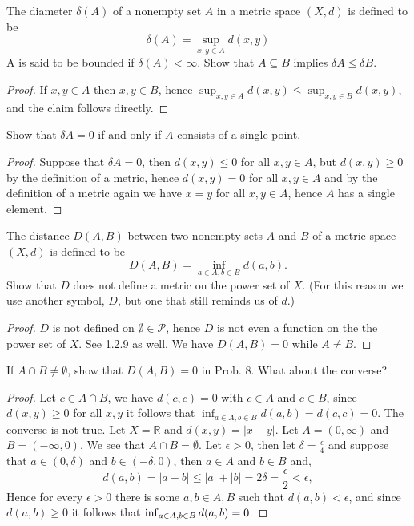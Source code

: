 \documentclass[12pt]{article}
\newcommand{\R}{\mathbb{R}}
\newcommand{\seq}{\subseteq}
\newcommand{\e}{\epsilon}
\newcommand{\de}{\delta}
\newcommand{\es}{\emptyset}
\newcommand{\mc}{\mathcal}
\newcommand{\ic}{\cap}
\newenvironment{exercise}[2][Exercise]{\begin{trivlist}
\item[\hskip \labelsep {\bfseries #1}\hskip \labelsep {\bfseries #2.}]}{\end{trivlist}}
\begin{document}
\begin{exercise}{1.2.6}
    The diameter $\de(A)$ of a nonempty set $A$ in a metric space $(X, d)$ is defined to be
    \[ \de (A) = \sup_{x, y \in A} d(x, y) \]
    A is said to be bounded if $\de(A) < \infty$. Show that $A \seq B$ implies $\de A \leq \de B$.
\end{exercise}
\begin{proof}
    If $x, y \in A$ then $x, y \in B$, hence $\sup_{x, y \in A} d(x, y) \leq \sup_{x, y \in B} d(x, y)$, and the claim follows directly.
\end{proof}

\begin{exercise}{1.2.7}
    Show that $\de A = 0$ if and only if $A$ consists of a single point.
\end{exercise}
\begin{proof}
    Suppose that $\de A = 0$, then $d(x, y) \leq 0$ for all $x, y \in A$, but $d(x, y) \geq 0$ by the definition of a metric, hence $d(x, y) = 0$ for all $x, y \in A$ and by the definition of a metric again we have $x = y$ for all $x, y \in A$, hence $A$ has a single element.
\end{proof}

\begin{exercise}{1.2.8}
    The distance $D(A, B)$ between two nonempty sets $A$ and $B$ of a metric space $(X, d)$ is defined to be
    \[ D(A, B) = \inf_{a \in A, b \in B} d(a, b). \]
    Show that $D$ does not define a metric on the power set of $X$. (For this reason we use another symbol, $D$, but one that still reminds us of $d$.)
\end{exercise}
\begin{proof}
    $D$ is not defined on $\es \in \mc P$, hence $D$ is not even a function on the the power set of $X$. See 1.2.9 as well. We have $D(A, B) = 0$ while $A \neq B$.
\end{proof}


\begin{exercise}{1.2.9}
    If $A \ic B \neq \es$, show that $D(A, B) = 0$ in Prob. 8. What about the converse?
\end{exercise}
\begin{proof}
    Let $c \in A \ic B$, we have $d(c, c) = 0$ with $c \in A$ and $c \in B$, since $d(x, y) \geq 0$ for all $x, y$ it follows that $\inf_{a \in A, b \in B} d(a, b) = d(c, c) = 0$. The converse is not true. Let $X = \R$ and $d(x, y) = |x-y|$. Let $A = (0, \infty)$ and $B = (-\infty, 0)$. We see that $A \ic B = \es$. Let $\e > 0$, then let $\de = \frac{\e}{4}$ and suppose that $a \in (0, \de)$ and $b \in (-\de, 0)$, then $a \in A$ and $b \in B$ and,
    \[ d(a, b) = |a-b| \leq |a| + |b| = 2 \de = \frac{\e}{2} < \e,   \]
    Hence for every $\e > 0$ there is some $a, b \in A, B$ such that $d(a, b) < \e$, and since $d(a, b) \geq 0$ it follows that $\inf_{a \in A, \\ b \in B} d(a, b) = 0$.
\end{proof}
\end{document}
